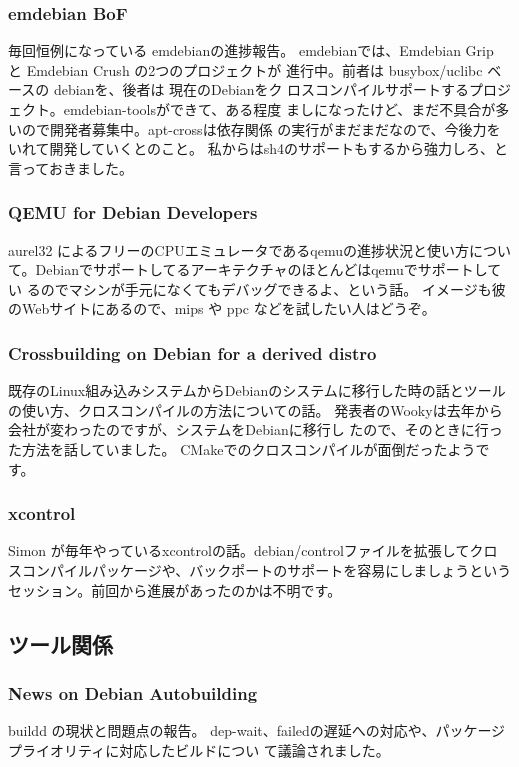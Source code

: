 \documentclass[mingoth,a4paper]{jsarticle}
\begin{document}
\subsubsection{emdebian BoF}
毎回恒例になっている emdebianの進捗報告。
emdebianでは、Emdebian Grip と Emdebian Crush の2つのプロジェクトが
進行中。前者は busybox/uclibc ベースの debianを、後者は 現在のDebianをク
ロスコンパイルサポートするプロジェクト。emdebian-toolsができて、ある程度
ましになったけど、まだ不具合が多いので開発者募集中。apt-crossは依存関係
の実行がまだまだなので、今後力をいれて開発していくとのこと。
私からはsh4のサポートもするから強力しろ、と言っておきました。

\subsubsection{QEMU for Debian Developers}
aurel32 によるフリーのCPUエミュレータであるqemuの進捗状況と使い方につい
て。Debianでサポートしてるアーキテクチャのほとんどはqemuでサポートしてい
るのでマシンが手元になくてもデバッグできるよ、という話。
イメージも彼のWebサイトにあるので、mips や ppc などを試したい人はどうぞ。

\subsubsection{Crossbuilding on Debian for a derived distro}
既存のLinux組み込みシステムからDebianのシステムに移行した時の話とツール
の使い方、クロスコンパイルの方法についての話。
発表者のWookyは去年から会社が変わったのですが、システムをDebianに移行し
たので、そのときに行った方法を話していました。
CMakeでのクロスコンパイルが面倒だったようです。

\subsubsection{xcontrol}
Simon が毎年やっているxcontrolの話。debian/controlファイルを拡張してクロ
スコンパイルパッケージや、バックポートのサポートを容易にしましょうという
セッション。前回から進展があったのかは不明です。

\subsection{ツール関係}

\subsubsection{News on Debian Autobuilding}
buildd の現状と問題点の報告。
dep-wait、failedの遅延への対応や、パッケージプライオリティに対応したビルドについ
て議論されました。
\end{document}
